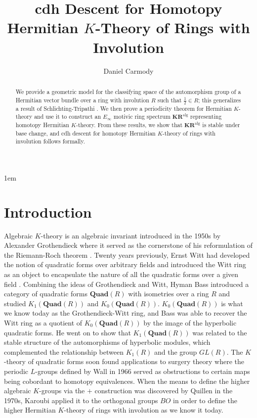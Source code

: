 \documentclass[edeposit,fullpage]{uiucthesis2009}
\title{cdh Descent for Homotopy Hermitian $K$-Theory of Rings with Involution}
\author{Daniel Carmody}
\newcommand{\KR}{\mathbf{KR}^{\mathrm{alg}}}
\newcommand{\Quad}{\mathbf{Quad}}
\theoremstyle{plain}
\numberwithin{lemma}{section}
\theoremstyle{definition}
\begin{document}
\maketitle

\parindent 1em%

\frontmatter

\begin{abstract}
We provide a geometric model for the classifying space of the
automorphism group of a Hermitian vector bundle over a ring with
involution $R$ such that $\frac{1}{2} \in R$; this generalizes a
result of Schlichting-Tripathi \cite{SchTri}. We then prove a
periodicity theorem for
Hermitian $K$-theory and use it to construct an $E_\infty$ motivic ring spectrum $\KR$
representing homotopy Hermitian $K$-theory. From these results, we
show that $\KR$ is stable under base change, and cdh descent for
homotopy Hermitian $K$-theory of rings with involution follows
formally. 
\end{abstract}

\tableofcontents

\mainmatter

\chapter{Introduction}

Algebraic $K$-theory is an algebraic invariant introduced in the 1950s by Alexander
Grothendieck where it served as the cornerstone of his reformulation
of the Riemann-Roch theorem \cite{Gro57}.  Twenty years previously, Ernst Witt had
developed the notion of quadratic forms over arbitrary fields and
introduced the Witt ring as an object to encapsulate the nature of
all the quadratic forms over a given field \cite{Witt1937}. Combining
the ideas of Grothendieck and Witt, Hyman Bass introduced a category of quadratic
forms  $\Quad(R)$
with isometries over a ring $R$ and studied $K_1(\Quad(R))$ and $K_0(\Quad(R))$. $K_0(\Quad(R))$ is what we know today as the
Grothendieck-Witt ring, and Bass was able to recover the Witt ring
as a quotient of $K_0(\Quad(R))$ by the image of the hyperbolic
quadratic forms. He went on to show that $K_1(\Quad(R))$ was related to the stable
structure of the automorphisms of hyperbolic modules, which complemented the relationship between $K_1(R)$ and the group $GL(R)$. The $K$-theory
of quadratic forms soon found applications to surgery theory where
the periodic $L$-groups defined by Wall in 1966 \cite{Wall66} served
as obstructions to certain maps being cobordant to homotopy equivalences. When
the means to define the higher algebraic $K$-groups via the $+$ construction was discovered by
Quillen in the 1970s, Karoubi applied it to the orthogonal groups $BO$
in order to define the higher Hermitian $K$-theory of rings with
involution as we know it today\cite{Kar73}.
\end{document}
